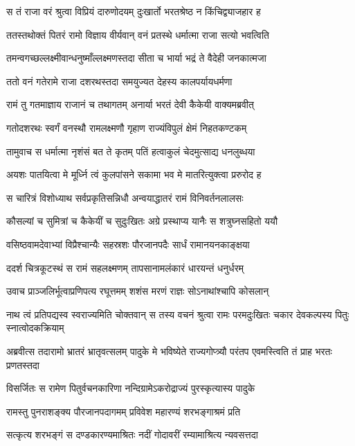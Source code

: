 \twolineshloka
{स तं राजा वरं श्रुत्वा विप्रियं दारुणोदयम्}
{दुःखार्तो भरतश्रेष्ठ न किंचिद्व्याजहार ह}


\twolineshloka
{ततस्तथोक्तं पितरं रामो विज्ञाय वीर्यवान्}
{वनं प्रतस्थे धर्मात्मा राजा सत्यो भवत्विति}


\twolineshloka
{तमन्वगच्छल्लक्ष्मीवान्धनुष्माँल्लक्ष्मणस्तदा}
{सीता च भार्या भद्रं ते वैदेही जनकात्मजा}


\twolineshloka
{ततो वनं गतेरामे राजा दशरथस्तदा}
{समयुज्यत देहस्य कालपर्यायधर्मणा}


\twolineshloka
{रामं तु गतमाज्ञाय राजानं च तथागतम्}
{अनार्या भरतं देवी कैकेयी वाक्यमब्रवीत्}


\twolineshloka
{गतोदशरथः स्वर्गं वनस्थौ रामलक्ष्मणौ}
{गृहाण राज्यंविपुलं क्षेमं निहतकण्टकम्}


\twolineshloka
{तामुवाच स धर्मात्मा नृशंसं बत ते कृतम्}
{पतिं हत्वाकुलं चेदमुत्साद्य धनलुब्धया}


\twolineshloka
{अयशः पातयित्वा मे मूर्ध्नि त्वं कुलपांसने}
{सकामा भव मे मातरित्युक्त्वा प्ररुरोद ह}


\twolineshloka
{स चारित्रं विशोध्याथ सर्वप्रकृतिसन्निधौ}
{अन्वयाद्धातरं रामं विनिवर्तनलालसः}


\twolineshloka
{कौसल्यां च सुमित्रां च कैकेयीं च सुदुःखितः}
{अग्रे प्रस्थाप्य यानैः स शत्रुघ्नसहितो ययौ}


\twolineshloka
{वसिष्ठवामदेवाभ्यां विप्रैश्चान्यैः सहस्रशः}
{पौरजानपदैः सार्धं रामानयनकाङ्क्षया}


\twolineshloka
{ददर्श चित्रकूटस्थं स रामं सहलक्ष्मणम्}
{तापसानामलंकारं धारयन्तं धनुर्धरम्}


\twolineshloka
{उवाच प्राञ्जलिर्भूत्वाप्रणिपत्य रघूत्तमम्}
{शशंस मरणं राज्ञः सोऽनाथांश्चापि कोसलान्}


नाथ त्वं प्रतिपद्यस्व स्वराज्यमिति चोक्तवान्
\twolineshloka
{स तस्य वचनं श्रुत्वा रामः परमदुःखितः}
{चकार देवकल्पस्य पितुः स्नात्वोदकक्रियाम्}


\threelineshloka
{अब्रवीत्स तदारामो भ्रातरं भ्रातृवत्सलम्}
{पादुके मे भविष्येते राज्यगोप्त्र्यौ परंतप}
{एवमस्त्विति तं प्राह भरतः प्रणतस्तदा}


\twolineshloka
{विसर्जितः स रामेण पितुर्वचनकारिणा}
{नन्दिग्रामेऽकरोद्राज्यं पुरस्कृत्यास्य पादुके}


\twolineshloka
{रामस्तु पुनराशङ्क्य पौरजानपदागमम्}
{प्रविवेश महारण्यं शरभङ्गाश्रमं प्रति}


\twolineshloka
{सत्कृत्य शरभङ्गं स दण्डकारण्यमाश्रितः}
{नदीं गोदावरीं रम्यामाश्रित्य न्यवसत्तदा}



